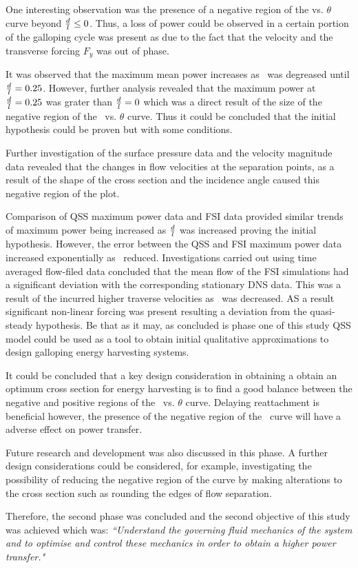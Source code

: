  One interesting observation was the presence of a negative region of the \cy vs. $\theta$ curve beyond $\frac{d}{l}\leq0$. Thus, a loss of power could be observed in a certain portion of the galloping cycle was present as due to the fact that the velocity and the transverse forcing $F_{y}$ was out of phase. 
 
 It was observed that the maximum mean power increases as \ratio\ was degreased until $\frac{d}{l}=0.25$. However, further analysis revealed that the maximum power at $\frac{d}{l}=0.25$ was grater than $\frac{d}{l}=0$ which was a direct result of the size of the negative region of the \cy\ vs. $\theta$ curve. Thus it could be concluded that the initial hypothesis could be proven but with some conditions.  
 
 Further investigation of the surface pressure data and the velocity magnitude data revealed that the changes in flow velocities at the separation points, as a result of the shape of the cross section and the incidence angle caused this negative region of the \cy plot. 
 
 Comparison of QSS maximum power data and FSI data provided similar trends of maximum power being increased as $\frac{d}{l}$ was increased proving the initial hypothesis. However, the error between the QSS and FSI maximum power data increased exponentially as \ratio\ reduced. Investigations carried out using time averaged flow-filed data concluded that the mean flow of the FSI simulations had a significant deviation with the corresponding stationary DNS data. This was a result of the incurred higher  traverse velocities as \ratio\ was decreased. AS a result significant non-linear forcing was present resulting a deviation from the quasi-steady hypothesis. Be that as it may, as concluded is phase one of this study QSS model could be used as a tool to obtain initial qualitative approximations to design galloping energy harvesting systems. 
 
 It could be concluded that a key design consideration in obtaining a obtain an optimum cross section for energy harvesting is to find a good balance between the negative and positive regions of the \cy\ vs. $\theta$ curve. Delaying reattachment is beneficial however, the presence of the negative region of the \cy\ curve will have a adverse effect on power transfer. 
 
 Future research and development was also discussed in this phase. A further design considerations could be considered, for example, investigating the possibility of reducing the negative region of the \cy curve by making alterations to the cross section such as rounding the edges of flow separation.
 
 Therefore, the second phase was concluded and the second objective of this study was achieved which was:\emph{ ``Understand the governing fluid mechanics of the system and to optimise and control these mechanics in order to obtain a higher power transfer."}
 
 
 
 